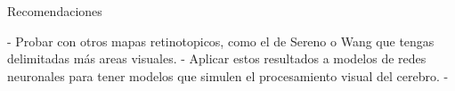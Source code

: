 \begin{recomendations}
    Recomendaciones
    
    - Probar con otros mapas retinotopicos, como el de Sereno o Wang que tengas delimitadas m\'as areas visuales.
    - Aplicar estos resultados a modelos de redes neuronales para tener modelos que simulen el procesamiento visual del cerebro.
    - 
\end{recomendations}
